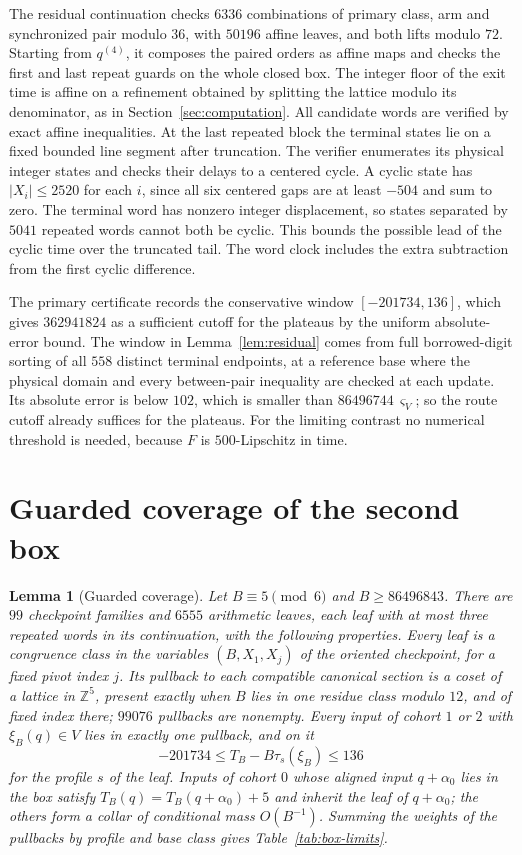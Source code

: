 \documentclass[11pt,reqno]{amsart}
\newtheorem{lemma}[theorem]{Lemma}
\theoremstyle{remark}
\newcommand{\Z}{\mathbb Z}
\begin{document}
The residual continuation checks \(6336\) combinations of primary class, arm and synchronized pair modulo \(36\), with \(50196\) affine leaves, and both lifts modulo \(72\). Starting from \(q^{(4)}\), it composes the paired orders as affine maps and checks the first and last repeat guards on the whole closed box. The integer floor of the exit time is affine on a refinement obtained by splitting the lattice modulo its denominator, as in Section~\ref{sec:computation}. All candidate words are verified by exact affine inequalities. At the last repeated block the terminal states lie on a fixed bounded line segment after truncation. The verifier enumerates its physical integer states and checks their delays to a centered cycle. A cyclic state has \(|X_i|\le2520\) for each \(i\), since all six centered gaps are at least \(-504\) and sum to zero. The terminal word has nonzero integer displacement, so states separated by \(5041\) repeated words cannot both be cyclic. This bounds the possible lead of the cyclic time over the truncated tail. The word clock includes the extra subtraction from the first cyclic difference.

The primary certificate records the conservative window \([-201734,136]\), which gives \(362941824\) as a sufficient cutoff for the plateaus by the uniform absolute-error bound. The window in Lemma~\ref{lem:residual} comes from full borrowed-digit sorting of all \(558\) distinct terminal endpoints, at a reference base where the physical domain and every between-pair inequality are checked at each update. Its absolute error is below \(102\), which is smaller than \(86496744\,\varsigma_V\); so the route cutoff already suffices for the plateaus. For the limiting contrast no numerical threshold is needed, because \(F\) is \(500\)-Lipschitz in time.

\section{Guarded coverage of the second box}\label{app:coverage}

\begin{lemma}[Guarded coverage]\label{lem:coverage}
Let \(B\equiv5\pmod6\) and \(B\ge86496843\). There are \(99\) checkpoint families and \(6555\) arithmetic leaves, each leaf with at most three repeated words in its continuation, with the following properties. Every leaf is a congruence class in the variables \((B,X_1,X_j)\) of the oriented checkpoint, for a fixed pivot index \(j\). Its pullback to each compatible canonical section is a coset of a lattice in \(\Z^5\), present exactly when \(B\) lies in one residue class modulo \(12\), and of fixed index there; \(99076\) pullbacks are nonempty. Every input of cohort \(1\) or \(2\) with \(\xi_B(q)\in V\) lies in exactly one pullback, and on it
\[
 -201734\le T_B-B\tau_s(\xi_B)\le136
\]
for the profile \(s\) of the leaf. Inputs of cohort \(0\) whose aligned input \(q+\alpha_0\) lies in the box satisfy \(T_B(q)=T_B(q+\alpha_0)+5\) and inherit the leaf of \(q+\alpha_0\); the others form a collar of conditional mass \(O(B^{-1})\). Summing the weights of the pullbacks by profile and base class gives Table~\ref{tab:box-limits}.
\end{lemma}
\end{document}
